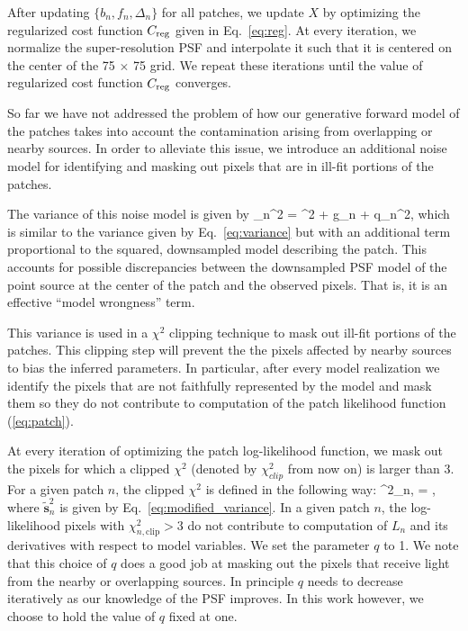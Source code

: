 After updating $\{b_n, f_n, \Delta_n\}$ for all patches, we update $X$ 
by optimizing the regularized cost function $C_{\rm reg}$ given in Eq.~\ref{eq:reg}. At every iteration, we normalize the super-resolution PSF and 
interpolate it such that it is centered on the center of the 75 $\times$ 75 grid. We repeat these iterations until the value of regularized cost function 
$C_{\rm reg}$ converges.

So far we have not addressed the problem of how our generative forward model of the patches takes into account the contamination arising from overlapping 
or nearby sources. In order to alleviate this issue, we introduce an additional noise model for identifying and masking out pixels that are 
in ill-fit portions of the patches.

The variance of this noise model is given by
\beq
{}_n^2 = \sigma^{2} + g_{n} + q_{n}^{2},
\label{eq:modified_variance}
\eeq 
which is similar to the variance given by Eq.~\ref{eq:variance} but with an additional term proportional to the squared, downsampled model describing the patch. This accounts for possible discrepancies between the downsampled PSF model of the 
point source at the center of the patch and the observed pixels. That is, it is an effective ``model wrongness'' term. 

This variance is used in a $\chi^2$ clipping technique to mask out ill-fit portions of the patches. 
This clipping step will prevent the the pixels affected by nearby sources to bias the inferred parameters.
In particular, after every model realization we identify the pixels that are not faithfully represented by the model and mask them so they do not 
contribute to computation of the patch likelihood function (\ref{eq:patch}).
 
At every iteration of optimizing the patch log-likelihood function, we mask out the pixels for which a clipped $\chi^{2}$ 
(denoted by $\chi^{2}_{clip}$ from now on) is larger than 3. For a given patch $n$, the clipped $\chi^{2}$ is defined in the following way:
\beq
\chi^{2}_{n,} = , 
\label{eq:chi_clip}
\eeq
where $\tilde{\mathbf{s}}_{n}^{2}$ is given by Eq.~\ref{eq:modified_variance}. In a given patch $n$, the log-likelihood pixels with $\chi^{2}_{n,\mathrm{clip}} > 3$ 
do not contribute to computation of $L_n$ and its derivatives with respect to model variables. 
We set the parameter $q$ to 1. We note that this choice of $q$ does a good job at masking out the pixels that receive light from the nearby or overlapping sources. 
In principle $q$ needs to decrease iteratively as our knowledge of the PSF improves. In this work however, we choose to hold the value of $q$ fixed at one. 


